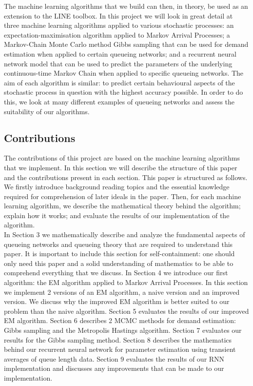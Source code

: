 \documentclass[a4paper,11pt,titlepage]{article}
\begin{document}
The machine learning algorithms that we build can then, in theory, be used as an extension to the LINE toolbox. In this project we will look in great detail at three machine learning algorithms applied to various stochastic processes: an expectation-maximisation algorithm applied to Markov Arrival Processes; a Markov-Chain Monte Carlo method Gibbs sampling that can be used for demand estimation when applied to certain queueing networks; and a recurrent neural network model that can be used to predict the parameters of the underlying continuous-time Markov Chain when applied to specific queueing networks. The aim of each algorithm is similar: to predict certain behavioural aspects of the stochastic process in question with the highest accuracy possible. In order to do this, we look at many different examples of queueing networks and assess the suitability of our algorithms. 

\subsection{Contributions}

The contributions of this project are based on the machine learning algorithms that we implement. In this section we will describe the structure of this paper and the contributions present in each section. This paper is structured as follows. We firstly introduce background reading topics and the essential knowledge required for comprehension of later ideals in the paper. Then, for each machine learning algorithm, we describe the mathematical theory behind the algorithm; explain how it works; and evaluate the results of our implementation of the algorithm.  \\

In Section 3 we mathematically describe and analyze the fundamental aspects of queueing networks and queueing theory that are required to understand this paper. It is important to include this section for self-containment: one should only need this paper and a solid understanding of mathematics to be able to comprehend everything that we discuss. In Section 4 we introduce our first algorithm: the EM algorithm applied to Markov Arrival Processes. In this section we implement 2 versions of an EM algorithm, a naive version and an improved version. We discuss why the improved EM algorithm is better suited to our problem than the naive algorithm. Section 5 evaluates the results of our improved EM algorithm. Section 6 describes 2 MCMC methods for demand estimation: Gibbs sampling and the Metropolis Hastings algorithm. Section 7 evaluates our results for the Gibbs sampling method. Section 8 describes the mathematics behind our recurrent neural network for parameter estimation using transient averages of queue length data. Section 9 evaluates the results of our RNN implementation and discusses any improvements that can be made to our implementation. \\
\end{document}
